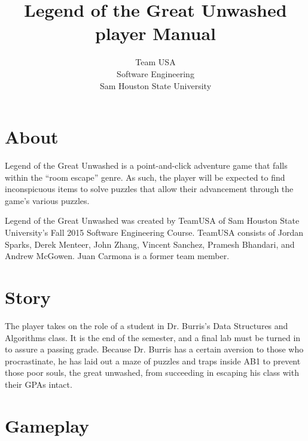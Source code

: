 \documentclass{article}
\begin{document}
%
%
\title{Legend of the Great Unwashed \\ player Manual}
\author{Team USA \\ Software Engineering \\ Sam Houston State University}
%
%
\pagestyle{fancy}
\fancyhead[RE,LO]{\leftmark}
\fancyfoot[RE,LO]{}
\renewcommand{\headrulewidth}{2pt}
\renewcommand{\thefootnote}{[\arabic{footnote}]}
%
%
\maketitle
\newpage
%
%
\tableofcontents
\newpage
%
%
\section{About}
	Legend of the Great Unwashed is a point-and-click adventure game that falls within the ``room escape'' genre. As such, the player will be expected to find inconspicuous items to solve puzzles that allow their advancement through the game's various puzzles. 
	
	Legend of the Great Unwashed was created by TeamUSA of Sam Houston State University's Fall 2015 Software Engineering Course. TeamUSA consists of Jordan Sparks, Derek Menteer, John Zhang, Vincent Sanchez, Pramesh Bhandari, and Andrew McGowen. Juan Carmona is a former team member. 
\section{Story}
	The player takes on the role of a student in Dr. Burris's Data Structures and Algorithms class. It is the end of the semester, and a final lab must be turned in to assure a passing grade. Because Dr. Burris has a certain aversion to those who procrastinate, he has laid out a maze of puzzles and traps inside AB1 to prevent those poor souls, the great unwashed, from succeeding in escaping his class with their GPAs intact. 
\section{Gameplay}
\end{document}
